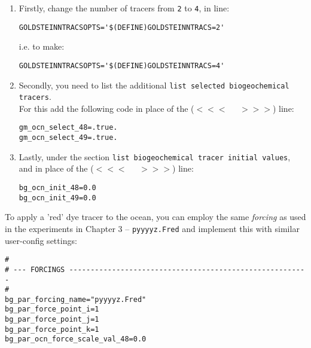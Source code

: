 \documentclass[11pt,fleqn]{book} %
\begin{document}
\vspace{4pt}
\begin{enumerate}
\item Firstly, change the number of tracers from \texttt{2} to \texttt{4}, in line:
\small\vspace{-2pt}\begin{verbatim}
GOLDSTEINNTRACSOPTS='$(DEFINE)GOLDSTEINNTRACS=2'
\end{verbatim}\vspace{-2pt}\normalsize
i.e. to make:
\small\vspace{-2pt}\begin{verbatim}
GOLDSTEINNTRACSOPTS='$(DEFINE)GOLDSTEINNTRACS=4'
\end{verbatim}\vspace{-2pt}\normalsize
\item Secondly, you need to list the additional \texttt{list selected biogeochemical tracers}.
\\For this add the following code in place of the (\(<<<\;\;\;\;\;>>>\)) line:
\small\vspace{-2pt}\begin{verbatim}
gm_ocn_select_48=.true.
gm_ocn_select_49=.true.
\end{verbatim}\vspace{-2pt}\normalsize
\item Lastly, under the section \texttt{list biogeochemical tracer initial values}, and in place of the (\(<<<\;\;\;\;\;>>>\)) line:
\small\vspace{-2pt}\begin{verbatim}
bg_ocn_init_48=0.0
bg_ocn_init_49=0.0
\end{verbatim}\vspace{-2pt}\normalsize
\end{enumerate}

To apply a 'red' dye tracer to the ocean, you can employ the same \textit{forcing} as used in the experiments in Chapter 3 -- \texttt{pyyyyz.Fred} and implement this with similar user-config settings:

\small\vspace{-2pt}\begin{verbatim}
#
# --- FORCINGS --------------------------------------------------------
#
bg_par_forcing_name="pyyyyz.Fred"
bg_par_force_point_i=1
bg_par_force_point_j=1
bg_par_force_point_k=1
bg_par_ocn_force_scale_val_48=0.0
\end{verbatim}\vspace{-2pt}\normalsize
\end{document}
